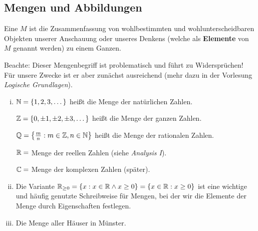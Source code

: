 \subsection{Mengen und Abbildungen}
\label{sec:1.2}

\begin{definition}
	\label{def:I.2.1}
	Eine  $M$ ist die Zusammenfassung von wohlbestimmten und wohlunterscheidbaren Objekten unserer Anschauung oder unseres Denkens (welche als \textbf{Elemente} von $M$ genannt werden) zu einem Ganzen. 
\end{definition}

Beachte: Dieser Mengenbegriff ist problematisch und führt zu Widersprüchen!
Für unsere Zwecke ist er aber zunächst ausreichend (mehr dazu in der Vorlesung \textit{Logische Grundlagen}).

\begin{beispiel}
	\label{bsp:I.2.2}
	\begin{enumerate}[(i)]
		\item $\mathbb{N} = \{1,2,3,\dots\}$ heißt die Menge der natürlichen Zahlen.
		
		$\mathbb{Z} = \{0, \pm 1, \pm 2, \pm 3, \dots\}$ heißt die Menge der ganzen Zahlen.
		
		$\mathbb{Q} = \left\{\frac{m}{n} : m \in \mathbb{Z}, n \in \mathbb{N}\right\}$ heißt die Menge der rationalen Zahlen.
		
		$\mathbb{R} = $ Menge der reellen Zahlen (siehe \textit{Analysis I}).
		
		$\mathbb{C} = $ Menge der komplexen Zahlen (später).
		\item  Die Variante $\mathbb{R}_{\geq 0} = \{x : x \in \mathbb{R} \wedge x \geq 0\} = \{x \in \mathbb{R} : x \geq 0\}$ ist eine wichtige und häufig genutzte Schreibweise für Mengen, bei der wir die Elemente der Menge durch Eigenschaften festlegen.
		\item Die Menge aller Häuser in Münster.
	\end{enumerate}
\end{beispiel}

